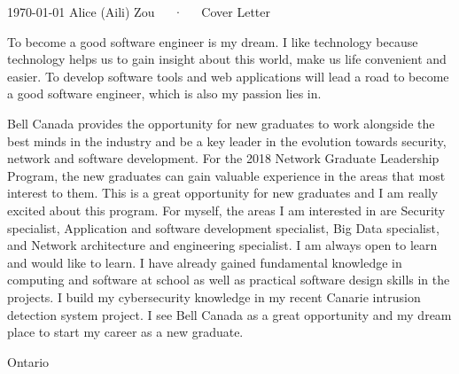 \documentclass[11pt, a4paper]{awesome-cv}
\begin{document}
\makecvheader[R]

\makecvfooter
  {\today}
  {Alice (Aili) Zou~~~·~~~Cover Letter}
  {}

\makelettertitle

\begin{cvletter}

To become a good software engineer is my dream. I like technology because technology helps us to gain insight about this world,
make us life convenient and easier. To develop software tools and web applications will lead a road to become a good software
engineer, which is also my passion lies in.

Bell Canada provides the opportunity for new graduates to work alongside the best minds in the industry and be a key leader in the
evolution towards security, network and software development. For the 2018 Network Graduate Leadership Program, the new graduates can gain valuable experience in the areas that most interest to them. This is a great opportunity for new graduates and I am really excited about this program. For myself, the areas I am interested in are Security specialist, Application and software development specialist, Big Data specialist, and Network architecture and engineering specialist.
I am always open to learn and would like to learn. I have already gained fundamental knowledge in computing and software at
school as well as practical software design skills in the projects. I build my cybersecurity knowledge in my recent Canarie intrusion
detection system project. I see Bell Canada as a great opportunity and my dream place to start my career as a new graduate.

Ontario


\end{cvletter}


\makeletterclosing
\end{document}
